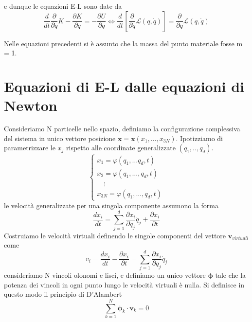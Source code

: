e dunque le equazioni E-L sono date da 
\begin{equation}
\frac{d}{d t} \frac{\partial}{\partial \dot{q}} K-\frac{\partial K}{\partial q}=-\frac{\partial U}{\partial q} \iff 
\frac{d}{d t}\left[\frac{\partial}{\partial \dot{q}} \mathcal{L}(q, \dot{q})\right]=\frac{\partial}{\partial q} \mathcal{L}(q, \dot{q})
\end{equation}

\begin{remark}
Nelle equazioni precedenti si \`{e} assunto che la massa del punto materiale fosse m = 1.	
\end{remark}

\section{Equazioni di E-L dalle equazioni di Newton}
Consideriamo N particelle nello spazio, definiamo la configurazione complessiva del sistema in unico vettore posizione $\bm{x}= \bm{x}(x_1,...,x_{3N})$. Ipotizziamo di parametrizzare le $x_j$ rispetto alle coordinate generalizzate $(q_1,..,q_d)$.
\begin{equation}
\left\{\begin{array}{l}
x_1 = \varphi\left(q_1, \ldots  q_d, t\right) \\
x_2 = \varphi\left(q_1, \ldots, q_d, t\right) \\
\quad \vdots \\
x_{3 N} = \varphi\left(q_1, \ldots, q_d, t\right)
\end{array}\right.
\end{equation}
le velocit\`{a} generalizzate per una singola componente assumono la forma 
\begin{equation}
	\frac{dx_i}{dt} = \sum_{j=1}^d \frac{\partial x_i}{\partial q_j}\dot{q}_j + \frac{\partial x_i}{\partial t}
\end{equation}
Costruiamo le velocit\`{a} virtuali definendo le singole componenti del vettore $\bm{v}_{virtuali}$ come
\begin{equation}
v_{i}=\frac{d x_i}{d t}-\frac{\partial x_i}{\partial t}=\sum_{j=1}^d \frac{\partial x_i}{\partial q_j} \dot{q}_j
\end{equation}
consideriamo N  vincoli olonomi e lisci, e definiamo un unico vettore $\bm{\phi}$ tale che la potenza dei vincoli in ogni punto lungo le velocit\`{a} virtuali \`{e} nulla. Si definisce in questo modo il principio di D'Alambert 
\begin{equation}
	\sum_{k=1}^{N} \bm{\phi}_{k} \cdot \bm{v}_{k} = 0 
\end{equation}
